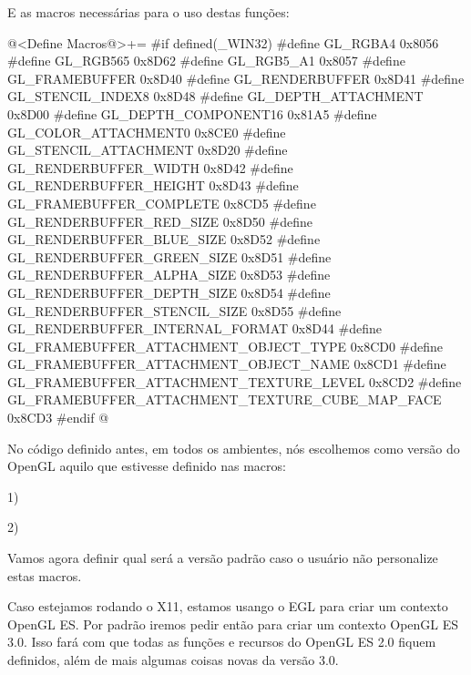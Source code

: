 E as macros necessárias para o uso destas funções:

\iniciocodigo
@<Define Macros@>+=
#if defined(_WIN32)
#define GL_RGBA4                                        0x8056
#define GL_RGB565                                       0x8D62
#define GL_RGB5_A1                                      0x8057
#define GL_FRAMEBUFFER                                  0x8D40
#define GL_RENDERBUFFER                                 0x8D41
#define GL_STENCIL_INDEX8                               0x8D48
#define GL_DEPTH_ATTACHMENT                             0x8D00
#define GL_DEPTH_COMPONENT16                            0x81A5
#define GL_COLOR_ATTACHMENT0                            0x8CE0
#define GL_STENCIL_ATTACHMENT                           0x8D20
#define GL_RENDERBUFFER_WIDTH                           0x8D42
#define GL_RENDERBUFFER_HEIGHT                          0x8D43
#define GL_FRAMEBUFFER_COMPLETE                         0x8CD5
#define GL_RENDERBUFFER_RED_SIZE                        0x8D50
#define GL_RENDERBUFFER_BLUE_SIZE                       0x8D52
#define GL_RENDERBUFFER_GREEN_SIZE                      0x8D51
#define GL_RENDERBUFFER_ALPHA_SIZE                      0x8D53
#define GL_RENDERBUFFER_DEPTH_SIZE                      0x8D54
#define GL_RENDERBUFFER_STENCIL_SIZE                    0x8D55
#define GL_RENDERBUFFER_INTERNAL_FORMAT                 0x8D44
#define GL_FRAMEBUFFER_ATTACHMENT_OBJECT_TYPE           0x8CD0
#define GL_FRAMEBUFFER_ATTACHMENT_OBJECT_NAME           0x8CD1
#define GL_FRAMEBUFFER_ATTACHMENT_TEXTURE_LEVEL         0x8CD2
#define GL_FRAMEBUFFER_ATTACHMENT_TEXTURE_CUBE_MAP_FACE 0x8CD3
#endif
@
\fimcodigo




No código definido antes, em todos os ambientes, nós escolhemos como
versão do OpenGL aquilo que estivesse definido nas macros:

1) 

2) 

Vamos agora definir qual será a versão padrão caso o usuário não
personalize estas macros.

Caso estejamos rodando o X11, estamos usango o EGL para criar um
contexto OpenGL ES. Por padrão iremos pedir então para criar um
contexto OpenGL ES 3.0. Isso fará com que todas as funções e recursos
do OpenGL ES 2.0 fiquem definidos, além de mais algumas coisas novas
da versão 3.0.

